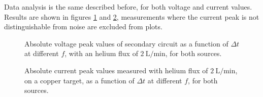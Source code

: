 Data analysis is the same described before, for both voltage and current values. Results are shown in figures \ref{fig:Vpp_gas} and \ref{fig:I_gas}, measurements where the current peak is not distinguishable from noise are excluded from plots.
\begin{figure}
 \centering
 \hfill
 \caption{Absolute voltage peak values of secondary circuit as a function of $\Delta t$ at different $f$, with an helium flux of $\SI{2}{\liter/\minute}$, for both sources.}
 \label{fig:Vpp_gas}
\end{figure}

\begin{figure}
 \centering
 \hfill
 \caption{Absolute current peak values measured with helium flux of $\SI{2}{\liter/\minute}$, on a copper target, as a function of $\Delta t$ at different $f$, for both sources.}
 \label{fig:I_gas}
\end{figure}

